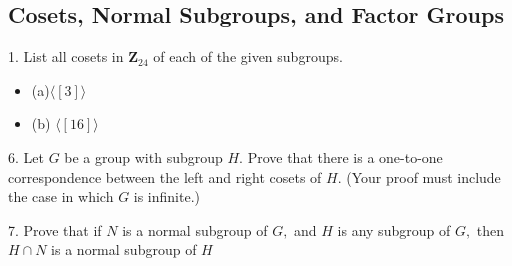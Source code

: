 \subsection{Cosets, Normal Subgroups, and Factor Groups}
\begin{mdframed}[style=darkQuesion]
  1. List all cosets in $\mathbf{Z}_{24}$ of each of the given subgroups.
\begin{itemize}
  \item[] {(a)$\langle[3]\rangle$}
  \item[] {(b) $\langle[16]\rangle$}
\end{itemize}
\end{mdframed}
\begin{mdframed}[style=darkAnswer,frametitle={Joe Starr}]
\end{mdframed}
\newpage
\begin{mdframed}[style=darkQuesion]
  6. Let $G$ be a group with subgroup $H .$ Prove that there is a one-to-one correspondence between the left and right cosets of $H .$ (Your proof must include the case in which
$G$ is infinite.)
\end{mdframed}
\begin{mdframed}[style=darkAnswer,frametitle={Joe Starr}]
\end{mdframed}
\newpage
\begin{mdframed}[style=darkQuesion]
  7. Prove that if $N$ is a normal subgroup of $G,$ and $H$ is any subgroup of $G,$ then $H \cap N$ is a normal subgroup of $H$
  
\end{mdframed}
